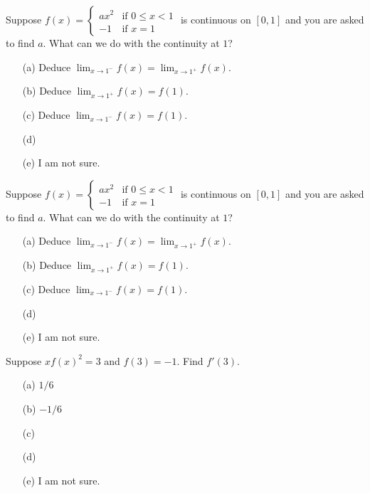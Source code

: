 \documentclass[14pt]{beamer}
\begin{document}
\begin{frame}[t]
  Suppose \(f(x) = \begin{cases} ax^{2} &\text{if } 0 \le x < 1 \\ -1 &\text{if } x = 1 \end{cases}\) is continuous on \([0,1]\) and you are asked to find \(a\). What can we do with the continuity at \(1\)?

  \medskip
  \begin{itemize} \setlength\itemsep{2ex}
    \item[(a)] Deduce \(\lim_{x \to 1^{-}} f(x) = \lim_{x \to 1^{+}} f(x)\).
    \item[(b)] Deduce \(\lim_{x \to 1^{+}} f(x) = f(1)\).
    \item[(c)] Deduce \(\lim_{x \to 1^{-}} f(x) = f(1)\).
    \item[(d)] 
    \item[(e)] I am not sure.
  \end{itemize} 
\end{frame}

\begin{frame}[t]
  Suppose \(f(x) = \begin{cases} ax^{2} &\text{if } 0 \le x < 1 \\ -1 &\text{if } x = 1 \end{cases}\) is continuous on \([0,1]\) and you are asked to find \(a\). What can we do with the continuity at \(1\)?

  \medskip
  \begin{itemize} \setlength\itemsep{2ex}
    \item[(a)] Deduce \(\lim_{x \to 1^{-}} f(x) = \lim_{x \to 1^{+}} f(x)\).
    \item[(b)] Deduce \(\lim_{x \to 1^{+}} f(x) = f(1)\).
    \item[(c)] Deduce \(\lim_{x \to 1^{-}} f(x) = f(1)\).
    \item[(d)] 
    \item[(e)] I am not sure.
  \end{itemize} 
\end{frame}

\begin{frame}[t]
  Suppose \(x f(x)^{2} = 3\) and \(f(3) = -1\). Find \(f'(3)\).

  \medskip
  \begin{itemize} \setlength\itemsep{2ex}
    \item[(a)] \(1/6\)
    \item[(b)] \(-1/6\)
    \item[(c)]
    \item[(d)]
    \item[(e)] I am not sure.
  \end{itemize}
\end{frame}
\end{document}

